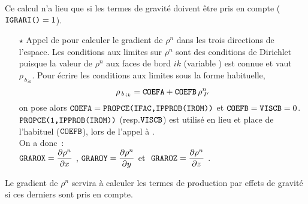 Ce calcul n'a lieu que si les termes de gravité doivent être pris en compte
($\text{\texttt{IGRARI()}} =1$).
\begin{itemize}
\item [$\star$] Appel de   pour calculer le gradient de $\rho^n$
dans les trois directions de l'espace. Les conditions aux limites sur $\rho^n$
sont des conditions de Dirichlet puisque la valeur de $\rho^n$ aux faces de bord
$ik$ (variable ) est connue et vaut $\rho_{\,b_{\,ik}}$. Pour écrire les conditions aux limites
sous la forme habituelle, $$\rho_{\,b_{\,ik}} = \text{\texttt{COEFA}} + \text{\texttt{COEFB}}
\,\rho^n_{\,I'}$$ on pose alors $\text{\texttt{COEFA}}=
\text{\texttt{PROPCE(IFAC,IPPROB(IROM))}}$ et $\text{\texttt{COEFB}} = \text{\texttt{VISCB}} = 0$.\\
$\text{\texttt{PROPCE(1,IPPROB(IROM))}}$ (resp.$\text{\texttt{VISCB}}$) est utilisé en lieu
et place de l'habituel  ($\text{\texttt{COEFB}}$), lors de l'appel à .\\
On a donc~:\\
$\displaystyle \text{\texttt{GRAROX}}= \frac{\partial \rho^n}{\partial x}\ $,$\displaystyle \ \var{GRAROY}= \frac{\partial
\rho^n}{\partial y}$ et $
\displaystyle \ \text{\texttt{GRAROZ}}= \frac{\partial \rho^n}{\partial z}\ $.

\end{itemize}

Le gradient de $\rho^n$ servira à calculer les termes de production par effets de gravité si ces derniers sont pris en compte.

